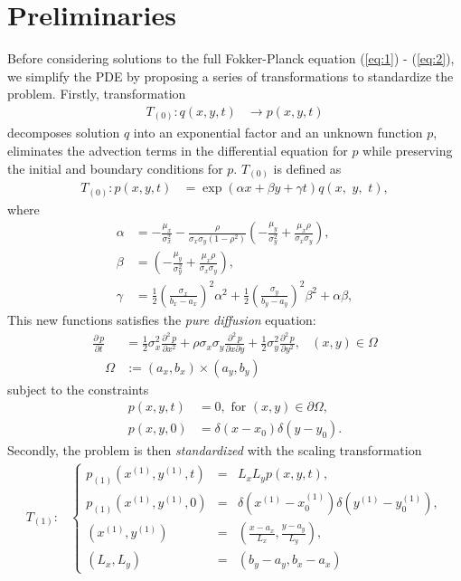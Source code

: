 \section{Preliminaries} \label{sec:approximate-sols}
Before considering solutions to the full Fokker-Planck equation
(\ref{eq:1}) - (\ref{eq:2}), we simplify the PDE by proposing a series
of transformations to standardize the problem. Firstly, transformation
\begin{align}
  T_{(0)} : q(x,y,t) &\to p(x,y,t)
\end{align}
decomposes solution $q$ into an exponential factor and an unknown
function $p$, eliminates the advection terms in the differential
equation for $p$ while preserving the initial and boundary conditions
for $p$. $T_{(0)}$ is defined as
\begin{align}
  T_{(0)}: p(x,y,t) &= \exp(\alpha x + \beta y + \gamma t) q\left( x, \,\, y, \,\, t \right), \label{eq:q-to-p}
\end{align}
where
\begin{align*}
  \alpha &= -\frac{\mu_x}{\sigma_x^2} - \frac{\rho}{\sigma_x\sigma_y(1-\rho^2)}\left( -\frac{\mu_y}{\sigma_y^2} + \frac{\mu_x \rho}{\sigma_x \sigma_y} \right), \\
  \beta &= \left( -\frac{\mu_y}{\sigma_y^2} + \frac{\mu_x \rho}{\sigma_x \sigma_y} \right), \\
  \gamma &= \frac{1}{2}\left( \frac{\sigma_x}{b_x-a_x} \right)^2 \alpha^2 + \frac{1}{2}\left(\frac{\sigma_y}{b_y-a_y}\right)^2 \beta^2 + \alpha\beta,
\end{align*}
This new functions satisfies the \textit{pure diffusion} equation:
\begin{align}
  \frac{\partial\, p}{\partial t} &= \frac{1}{2}\sigma_x^2 \frac{\partial^2\, p}{\partial x^2} + \rho\sigma_x\sigma_y \frac{\partial^2\, p}{\partial x \partial y} + \frac{1}{2}\sigma_y^2 \frac{\partial^2\, p}{\partial y^2}, & (x,y) \in \Omega \label{eq:qq} \\
  \quad \Omega &:= (a_x,b_x) \times (a_y,b_y) \nonumber
\end{align}
subject to the constraints
\begin{align}
  p(x,y,t) &=0,\mbox{ for } (x,y) \in \partial \Omega, \nonumber \\
  p(x,y,0) &= \delta\left( x - x_0 \right) \delta\left(y-y_0\right). \nonumber
\end{align}
Secondly, the problem is then \textit{standardized} with the scaling transformation
\begin{align}
  T_{(1)}: & \left\{ \begin{array}{ccc}
                       p_{(1)}(x^{(1)}, y^{(1)}, t) &=& L_xL_y p(x,y,t), \\
                       p_{(1)}(x^{(1)}, y^{(1)}, 0) &=& \delta(x^{(1)}-x_0^{(1)}) \delta(y^{(1)}-y_0^{(1)}), \\
                       (x^{(1)}, y^{(1)}) &=& \left(\frac{x - a_x}{L_x}, \frac{y - a_y}{L_y} \right), \\
                       (L_x,L_y) &=& \left(b_y - a_y, b_x - a_x\right)
                     \end{array} \right.
\end{align}
